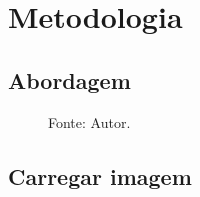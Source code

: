 \section{Metodologia}

\subsection{Abordagem}
\begin{frame}
	\begin{figure}
		\centering
		
		\caption*{Fonte: Autor.}
	\end{figure}
\end{frame}

\subsection{Carregar imagem}
